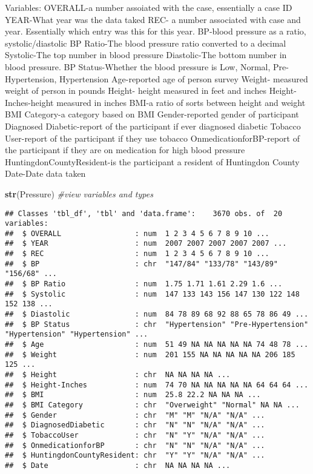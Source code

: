 \documentclass[
]{article}
\newenvironment{Shaded}{\begin{snugshade}}{\end{snugshade}}
\newcommand{\CommentTok}[1]{\textcolor[rgb]{0.56,0.35,0.01}{\textit{#1}}}
\newcommand{\KeywordTok}[1]{\textcolor[rgb]{0.13,0.29,0.53}{\textbf{#1}}}
\newcommand{\NormalTok}[1]{#1}
\begin{document}
Variables: OVERALL-a number assoiated with the case, essentially a case
ID YEAR-What year was the data taked REC- a number associated with case
and year. Essentially which entry was this for this year. BP-blood
pressure as a ratio, systolic/diastolic BP Ratio-The blood pressure
ratio converted to a decimal Systolic-The top number in blood pressure
Diastolic-The bottom number in blood pressure. BP Status-Whether the
blood pressure is Low, Normal, Pre-Hypertension, Hypertension
Age-reported age of person survey Weight- measured weight of person in
pounds Height- height measured in feet and inches Height-Inches-height
measured in inches BMI-a ratio of sorts between height and weight BMI
Category-a category based on BMI Gender-reported gender of participant
Diagnosed Diabetic-report of the participant if ever diagnosed diabetic
Tobacco User-report of the participant if they use tobacco
OnmedicationforBP-report of the participant if they are on medication
for high blood pressure HuntingdonCountyResident-is the participant a
resident of Huntingdon County Date-Date data taken

\begin{Shaded}
\begin{Highlighting}[]
\KeywordTok{str}\NormalTok{(Pressure) }\CommentTok{#view variables and types}
\end{Highlighting}
\end{Shaded}

\begin{verbatim}
## Classes 'tbl_df', 'tbl' and 'data.frame':    3670 obs. of  20 variables:
##  $ OVERALL                 : num  1 2 3 4 5 6 7 8 9 10 ...
##  $ YEAR                    : num  2007 2007 2007 2007 2007 ...
##  $ REC                     : num  1 2 3 4 5 6 7 8 9 10 ...
##  $ BP                      : chr  "147/84" "133/78" "143/89" "156/68" ...
##  $ BP Ratio                : num  1.75 1.71 1.61 2.29 1.6 ...
##  $ Systolic                : num  147 133 143 156 147 130 122 148 152 138 ...
##  $ Diastolic               : num  84 78 89 68 92 88 65 78 86 49 ...
##  $ BP Status               : chr  "Hypertension" "Pre-Hypertension" "Hypertension" "Hypertension" ...
##  $ Age                     : num  51 49 NA NA NA NA NA 74 48 78 ...
##  $ Weight                  : num  201 155 NA NA NA NA NA 206 185 125 ...
##  $ Height                  : chr  NA NA NA NA ...
##  $ Height-Inches           : num  74 70 NA NA NA NA NA 64 64 64 ...
##  $ BMI                     : num  25.8 22.2 NA NA NA ...
##  $ BMI Category            : chr  "Overweight" "Normal" NA NA ...
##  $ Gender                  : chr  "M" "M" "N/A" "N/A" ...
##  $ DiagnosedDiabetic       : chr  "N" "N" "N/A" "N/A" ...
##  $ TobaccoUser             : chr  "N" "Y" "N/A" "N/A" ...
##  $ OnmedicationforBP       : chr  "N" "N" "N/A" "N/A" ...
##  $ HuntingdonCountyResident: chr  "Y" "Y" "N/A" "N/A" ...
##  $ Date                    : chr  NA NA NA NA ...
\end{verbatim}
\end{document}
